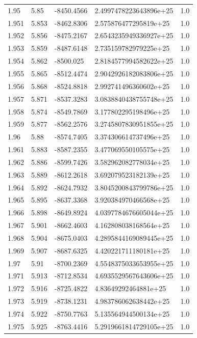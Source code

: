\begin{tabular}{lllll}
1.95 & 5.85 & -8450.4566 & 2.4997478223643896e+25 & 1.0 \\
1.951 & 5.853 & -8462.8306 & 2.575876477295819e+25 & 1.0 \\
1.952 & 5.856 & -8475.2167 & 2.6543235949336927e+25 & 1.0 \\
1.953 & 5.859 & -8487.6148 & 2.735159782979225e+25 & 1.0 \\
1.954 & 5.862 & -8500.025 & 2.8184577994582622e+25 & 1.0 \\
1.955 & 5.865 & -8512.4474 & 2.9042926182083806e+25 & 1.0 \\
1.956 & 5.868 & -8524.8818 & 2.992741496360602e+25 & 1.0 \\
1.957 & 5.871 & -8537.3283 & 3.0838840438755748e+25 & 1.0 \\
1.958 & 5.874 & -8549.7869 & 3.177802295198496e+25 & 1.0 \\
1.959 & 5.877 & -8562.2576 & 3.2745807830951855e+25 & 1.0 \\
1.96 & 5.88 & -8574.7405 & 3.374306614737496e+25 & 1.0 \\
1.961 & 5.883 & -8587.2355 & 3.477069550105575e+25 & 1.0 \\
1.962 & 5.886 & -8599.7426 & 3.582962082778034e+25 & 1.0 \\
1.963 & 5.889 & -8612.2618 & 3.692079523182139e+25 & 1.0 \\
1.964 & 5.892 & -8624.7932 & 3.8045200843799786e+25 & 1.0 \\
1.965 & 5.895 & -8637.3368 & 3.920384970466568e+25 & 1.0 \\
1.966 & 5.898 & -8649.8924 & 4.0397784676605044e+25 & 1.0 \\
1.967 & 5.901 & -8662.4603 & 4.162808038168564e+25 & 1.0 \\
1.968 & 5.904 & -8675.0403 & 4.2895844169089445e+25 & 1.0 \\
1.969 & 5.907 & -8687.6325 & 4.420221711180181e+25 & 1.0 \\
1.97 & 5.91 & -8700.2369 & 4.5548375033653955e+25 & 1.0 \\
1.971 & 5.913 & -8712.8534 & 4.6935529567643606e+25 & 1.0 \\
1.972 & 5.916 & -8725.4822 & 4.83649292464881e+25 & 1.0 \\
1.973 & 5.919 & -8738.1231 & 4.983786062638442e+25 & 1.0 \\
1.974 & 5.922 & -8750.7763 & 5.135564944500134e+25 & 1.0 \\
1.975 & 5.925 & -8763.4416 & 5.2919661814729105e+25 & 1.0 \\

\end{tabular}
